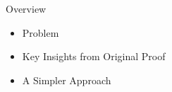 \begin{frame}{Overview}
    \begin{itemize}[<+->]
        \item Problem
        \item Key Insights from Original Proof
        \item A Simpler Approach
    \end{itemize}
\end{frame}